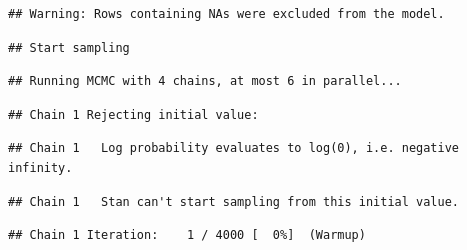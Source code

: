 \documentclass[
]{article}
\newenvironment{Shaded}{\begin{snugshade}}{\end{snugshade}}
\newcommand{\AttributeTok}[1]{\textcolor[rgb]{0.77,0.63,0.00}{#1}}
\newcommand{\CommentTok}[1]{\textcolor[rgb]{0.56,0.35,0.01}{\textit{#1}}}
\newcommand{\DecValTok}[1]{\textcolor[rgb]{0.00,0.00,0.81}{#1}}
\newcommand{\FloatTok}[1]{\textcolor[rgb]{0.00,0.00,0.81}{#1}}
\newcommand{\FunctionTok}[1]{\textcolor[rgb]{0.00,0.00,0.00}{#1}}
\newcommand{\NormalTok}[1]{#1}
\newcommand{\OtherTok}[1]{\textcolor[rgb]{0.56,0.35,0.01}{#1}}
\newcommand{\SpecialCharTok}[1]{\textcolor[rgb]{0.00,0.00,0.00}{#1}}
\newcommand{\StringTok}[1]{\textcolor[rgb]{0.31,0.60,0.02}{#1}}
\begin{document}
\begin{Shaded}
\end{Shaded}

\begin{verbatim}
## Warning: Rows containing NAs were excluded from the model.
\end{verbatim}

\begin{verbatim}
## Start sampling
\end{verbatim}

\begin{verbatim}
## Running MCMC with 4 chains, at most 6 in parallel...
\end{verbatim}

\begin{verbatim}
## Chain 1 Rejecting initial value:
\end{verbatim}

\begin{verbatim}
## Chain 1   Log probability evaluates to log(0), i.e. negative infinity.
\end{verbatim}

\begin{verbatim}
## Chain 1   Stan can't start sampling from this initial value.
\end{verbatim}

\begin{verbatim}
## Chain 1 Iteration:    1 / 4000 [  0%]  (Warmup)
\end{verbatim}
\end{document}
